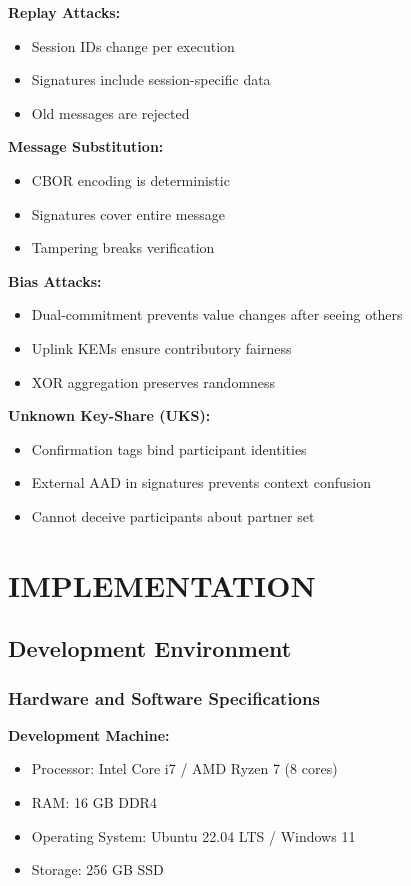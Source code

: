 \documentclass[12pt,a4paper]{report}
\begin{document}
\textbf{Replay Attacks:}
\begin{itemize}
\item Session IDs change per execution
\item Signatures include session-specific data
\item Old messages are rejected
\end{itemize}

\textbf{Message Substitution:}
\begin{itemize}
\item CBOR encoding is deterministic
\item Signatures cover entire message
\item Tampering breaks verification
\end{itemize}

\textbf{Bias Attacks:}
\begin{itemize}
\item Dual-commitment prevents value changes after seeing others
\item Uplink KEMs ensure contributory fairness
\item XOR aggregation preserves randomness
\end{itemize}

\textbf{Unknown Key-Share (UKS):}
\begin{itemize}
\item Confirmation tags bind participant identities
\item External AAD in signatures prevents context confusion
\item Cannot deceive participants about partner set
\end{itemize}


\chapter{IMPLEMENTATION}

\section{Development Environment}

\subsection{Hardware and Software Specifications}

\textbf{Development Machine:}
\begin{itemize}
\item Processor: Intel Core i7 / AMD Ryzen 7 (8 cores)
\item RAM: 16 GB DDR4
\item Operating System: Ubuntu 22.04 LTS / Windows 11
\item Storage: 256 GB SSD
\end{itemize}
\end{document}
